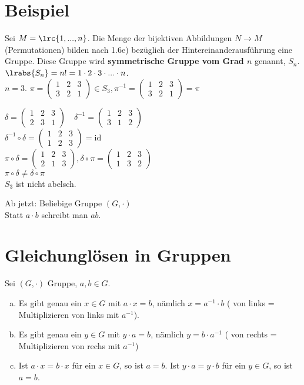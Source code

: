 	\section{Beispiel}

	Sei $M=\lrc{1,...,n}$. Die Menge der bijektiven Abbildungen $N\rightarrow M$ (Permutationen) bilden nach 1.6e) bezüglich der Hintereinanderausführung eine Gruppe. Diese Gruppe wird \textbf{symmetrische Gruppe vom Grad $n$} genannt, $S_n$.\\
	$\lrabs{S_n}=n!=1\cdot 2\cdot 3\cdot...\cdot n$.\\
	$n=3$. $\pi=\begin{pmatrix}1&2&3\\3&2&1\end{pmatrix}\in S_3,\pi^{-1}=\begin{pmatrix}1&2&3\\3&2&1\end{pmatrix}=\pi$

	$\delta=\begin{pmatrix}1&2&3\\2&3&1\end{pmatrix}
	\quad\delta^{-1}=
	\begin{pmatrix}1&2&3\\3&1&2\end{pmatrix}$\\
	$\delta^{-1}\circ\delta=
\begin{pmatrix}1&2&3\\1&2&3\end{pmatrix}=\mbox{id}$\\
	$\pi\circ\delta=\begin{pmatrix}1&2&3\\2&1&3\end{pmatrix},\delta\circ\pi=\begin{pmatrix}1&2&3\\1&3&2\end{pmatrix}$\\
	$\pi\circ\delta\neq\delta\circ\pi$\\
	$S_3$ ist nicht abelsch.

	Ab jetzt: Beliebige Gruppe $(G,\cdot)$\\
	Statt $a\cdot b$ schreibt man $ab$.

	\section{Gleichunglösen in Gruppen}

	Sei $(G,\cdot)$ Gruppe, $a,b\in G$.
	\begin{enumerate}[a)]
		\item Es gibt genau ein $x\in G$ mit $a\cdot x=b$, nämlich $x=a^{-1}\cdot b$ ( von links = Multiplizieren von links mit $a^{-1}$).

		\item Es gibt genau ein $y\in G$ mit $y\cdot a=b$, nämlich $y=b\cdot a^{-1}$ ( von rechts = Multiplizieren von rechs mit $a^{-1}$)

		\item Ist $a\cdot x=b\cdot x$ für ein $x\in G$, so ist $a=b$. Ist $y\cdot a=y\cdot b$ für ein $y\in G$, so ist $a=b$.
	\end{enumerate}

